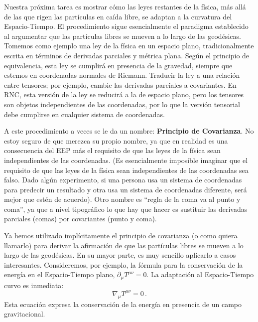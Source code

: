 \documentclass[11pt,b5paper,openany,twoside]{book}
\newcommand{\mn}{{\mu\nu}}
\newcommand{\p}[1]{{\partial_{#1}}}
\begin{document}
Nuestra próxima tarea es mostrar cómo las leyes restantes de la física, más allá de las que rigen las partículas en caída libre, se adaptan a la curvatura del Espacio-Tiempo.
El procedimiento sigue esencialmente el paradigma establecido al argumentar que las partículas libres se mueven a lo largo de las geodésicas.
Tomemos como ejemplo una ley de la física en un espacio plano, tradicionalmente escrita en términos de derivadas parciales y métrica plana.
Según el principio de equivalencia, esta ley se cumplirá en presencia de la gravedad, siempre que estemos en coordenadas normales de Riemann.
Traducir la ley a una relación entre tensores; por ejemplo, cambie las derivadas parciales a covariantes.
En RNC, esta versión de la ley se reducirá a la de espacio plano, pero los tensores son objetos independientes de las coordenadas, por lo que la versión tensorial debe cumplirse en cualquier sistema de coordenadas.

A este procedimiento a veces se le da un nombre: {\bf Principio de Covarianza}.
No estoy seguro de que merezca su propio nombre, ya que en realidad es una consecuencia del EEP más el requisito de que las leyes de la física sean independientes de las coordenadas.
(Es esencialmente imposible imaginar que el requisito de que las leyes de la física sean independientes de las coordenadas sea falso.
Dado algún experimento, si una persona usa un sistema de coordenadas para predecir un resultado y otra usa un sistema de coordenadas diferente, será mejor que estén de acuerdo).
Otro nombre es ``regla de la coma va al punto y coma'', ya que a nivel tipográfico lo que hay que hacer es sustituir las derivadas parciales (comas) por covariantes (punto y coma).

Ya hemos utilizado implícitamente el principio de covarianza (o como quiera llamarlo) para derivar la afirmación de que las partículas libres se mueven a lo largo de las geodésicas.
En su mayor parte, es muy sencillo aplicarlo a casos interesantes.
Consideremos, por ejemplo, la fórmula para la conservación de la energía en el Espacio-Tiempo plano, $\p\mu T^\mn =0$.
La adaptación al Espacio-Tiempo curvo es inmediata:
\begin{equation}
\nabla_\mu T^\mn =0\,.\label{4.23}
\end{equation}
Esta ecuación expresa la conservación de la energía en presencia de un campo gravitacional.
\end{document}
